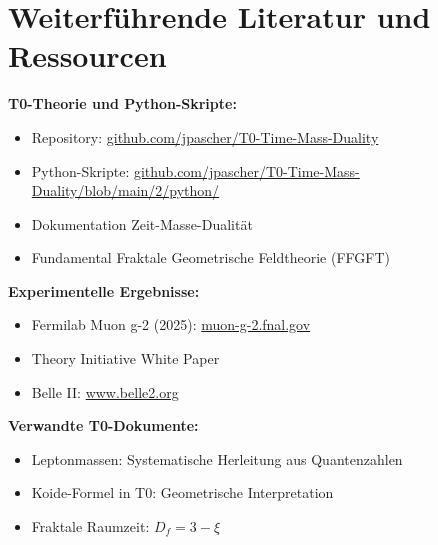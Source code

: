 	\section*{Weiterführende Literatur und Ressourcen}
	
	\textbf{T0-Theorie und Python-Skripte:}
	\begin{itemize}
		\item Repository: \href{https://github.com/jpascher/T0-Time-Mass-Duality}{github.com/jpascher/T0-Time-Mass-Duality}
		\item Python-Skripte: \href{https://github.com/jpascher/T0-Time-Mass-Duality/blob/main/2/python/}{github.com/jpascher/T0-Time-Mass-Duality/blob/main/2/python/}
		\item Dokumentation Zeit-Masse-Dualität
		\item Fundamental Fraktale Geometrische Feldtheorie (FFGFT)
	\end{itemize}
	
	\textbf{Experimentelle Ergebnisse:}
	\begin{itemize}
		\item Fermilab Muon g-2 (2025): \href{https://muon-g-2.fnal.gov/}{muon-g-2.fnal.gov}
		\item Theory Initiative White Paper
		\item Belle II: \href{https://www.belle2.org/}{www.belle2.org}
	\end{itemize}
	
	\textbf{Verwandte T0-Dokumente:}
	\begin{itemize}
		\item Leptonmassen: Systematische Herleitung aus Quantenzahlen
		\item Koide-Formel in T0: Geometrische Interpretation
		\item Fraktale Raumzeit: $D_f = 3 - \xi$
	\end{itemize}
	